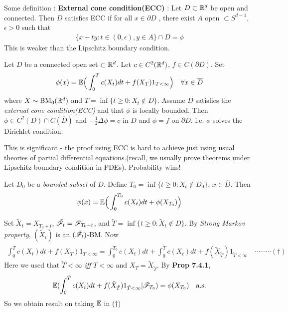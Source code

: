 \documentclass[12pt,a4paper]{report}
\newenvironment{proof}
{\begin{changemargin}{1cm}{0.5cm} 
	}%
	{\end{changemargin}
}
\begin{document}
Some definition : \textbf{External cone condition(ECC)} : Let $D \subset \mathbb{R}^d$ be open and connected. Then $D$ satisfies ECC if for all $x\in \partial D$ , there exist $A$ open $\subset S^{d-1}$, $\epsilon >0$ such that
\begin{align*}
\{x+ty : t\in (0,\epsilon), y\in A \} \cap D = \phi
\end{align*}
This is weaker than the Lipschitz boundary condition.

\s
{} Let $D$ be a connected open set $\subset \mathbb{R}^d$. Let $c\in C^2(\mathbb{R}^d)$, $f\in C(\partial D)$. Set
\begin{align*}
\phi(x) = \mathbb{E} \Big( \int_0^T c(X_t) dt + f(X_T) 1_{T<\infty} \Big) \quad \forall x\in \overline{D}
\end{align*}
where $X \sim \text{BM}_0(\mathbb{R}^d)$ and $T = \inf \{ t\geq 0: X_t \not\in D \}$. Assume $D$ satisfies the \emph{external cone condition(ECC)} and that $\phi$ is locally bounded. Then $\phi \in C^2(D) \cap C(\overline{D})$ and $-\frac{1}{2}\Delta \phi =c$ in $D$ and $\phi =f$ on $\partial D$. i.e. $\phi$ solves the Dirichlet condition.
\s

This is significant - the proof using ECC is hard to achieve just using usual theories of partial differential equations.(recall, we usually prove theorems under Lipschitz boundary condition in PDEs). Probability wins!
\s

 Let $D_0$ be a \emph{bounded subset} of $D$. Define $T_0 = \inf \{t\geq 0: X_t \not\in D_0 \}$, $x\in \overline{D}$. Then
\begin{align*}
\phi(x) = \mathbb{E} \Big( \int_0^{T_0} c(X_t) dt + \phi(X_{T_{0}}) \Big)
\end{align*}
\begin{proof}
\pf Set $\tilde{X}_t = X_{T_0 +t}$, $\tilde{\mathscr{F}}_{t} = \mathscr{F}_{T_0 +t}$, and $\tilde{T} = \inf \{ t\geq 0 : \tilde{X}_t \not\in D \}$. By \emph{Strong Markov property}, $(\tilde{X}_t)$ is an $(\tilde{\mathscr{F}}_t)$-BM. Now
\begin{align*}
\int_0^T c(X_t) dt + f(X_T) 1_{T<\infty} = \int_0^{T_0} c(X_t) dt + \int_0^{\tilde{T}} c(X_t) dt + f(\tilde{X}_{\tilde{T}})1_{\tilde{T}<\infty} \quad \cdots\cdots\cdots (\dagger)
\end{align*}
Here we used that $\tilde{T}<\infty$ \emph{iff} $T<\infty$ and $X_T = \tilde{X}_{\tilde{T}}$. By \textbf{Prop 7.4.1},
\begin{align*}
\mathbb{E}( \int_0^{\tilde{T}} c(X_t) dt + f(\tilde{X}_{\tilde{T}})1_{\tilde{T}<\infty} | \mathscr{F}_{T_0} ) = \phi(X_{T_0}) \quad \text{a.s.}
\end{align*}
So we obtain result on taking $\mathbb{E}$ in ($\dagger$)

\eop
\end{proof}
\s
\end{document}
